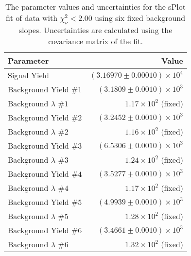 
\begin{table}[ht]
    \begin{center}
        \begin{tabular}{lr}\toprule
            Parameter & Value \\\midrule
            Signal Yield & $(3.16970 \pm 0.00010) \times 10^{4}$ \\
            Background Yield $\#1$ & $(3.1809 \pm 0.0010) \times 10^{3}$ \\
            Background $\lambda$ $\#1$ & $1.17 \times 10^{2}$ (fixed) \\
            Background Yield $\#2$ & $(3.2452 \pm 0.0010) \times 10^{3}$ \\
            Background $\lambda$ $\#2$ & $1.16 \times 10^{2}$ (fixed) \\
            Background Yield $\#3$ & $(6.5306 \pm 0.0010) \times 10^{3}$ \\
            Background $\lambda$ $\#3$ & $1.24 \times 10^{2}$ (fixed) \\
            Background Yield $\#4$ & $(3.5277 \pm 0.0010) \times 10^{3}$ \\
            Background $\lambda$ $\#4$ & $1.17 \times 10^{2}$ (fixed) \\
            Background Yield $\#5$ & $(4.9939 \pm 0.0010) \times 10^{3}$ \\
            Background $\lambda$ $\#5$ & $1.28 \times 10^{2}$ (fixed) \\
            Background Yield $\#6$ & $(3.4661 \pm 0.0010) \times 10^{3}$ \\
            Background $\lambda$ $\#6$ & $1.32 \times 10^{2}$ (fixed) \\\bottomrule
        \end{tabular}
        \caption{The parameter values and uncertainties for the sPlot fit of data with $\chi^2_\nu < 2.00$ using six fixed background slopes. Uncertainties are calculated using the covariance matrix of the fit.}\label{tab:splot-fit-results-chisqdof-2.00-fixed-6}
    \end{center}
\end{table}
